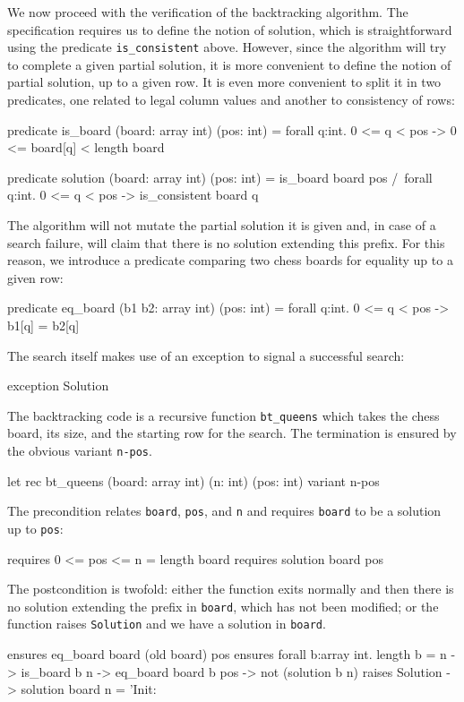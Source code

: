 We now proceed with the verification of the backtracking algorithm.
The specification requires us to define the notion of solution, which
is straightforward using the predicate \verb|is_consistent| above.
However, since the algorithm will try to complete a given partial
solution, it is more convenient to define the notion of partial
solution, up to a given row. It is even more convenient to split it in
two predicates, one related to legal column values and another to
consistency of rows:
\begin{whycode}
  predicate is_board (board: array int) (pos: int) =
    forall q:int. 0 <= q < pos -> 0 <= board[q] < length board

  predicate solution (board: array int) (pos: int) =
    is_board board pos /\
    forall q:int. 0 <= q < pos -> is_consistent board q
\end{whycode}
The algorithm will not mutate the partial solution it is given and,
in case of a search failure, will claim that there is no solution
extending this prefix. For this reason, we introduce a predicate
comparing two chess boards for equality up to a given row:
\begin{whycode}
  predicate eq_board (b1 b2: array int) (pos: int) =
    forall q:int. 0 <= q < pos -> b1[q] = b2[q]
\end{whycode}
The search itself makes use of an exception to signal a successful search:
\begin{whycode}
  exception Solution
\end{whycode}
The backtracking code is a recursive function \verb|bt_queens| which
takes the chess board, its size, and the starting row for the search.
The termination is ensured by the obvious variant \texttt{n-pos}.
\begin{whycode}
  let rec bt_queens (board: array int) (n: int) (pos: int)
    variant  { n-pos }
\end{whycode}
The precondition relates \texttt{board}, \texttt{pos}, and \texttt{n}
and requires \texttt{board} to be a solution up to \texttt{pos}:
\begin{whycode}
    requires { 0 <= pos <= n = length board }
    requires { solution board pos }
\end{whycode}
The postcondition is twofold: either the function exits normally and
then there is no solution extending the prefix in \texttt{board},
which has not been modified;
or the function raises \texttt{Solution} and we have a solution in
\texttt{board}.
\begin{whycode}
    ensures  { eq_board board (old board) pos }
    ensures  { forall b:array int. length b = n -> is_board b n ->
                 eq_board board b pos -> not (solution b n) }
    raises   { Solution -> solution board n }
  = 'Init:
\end{whycode}
